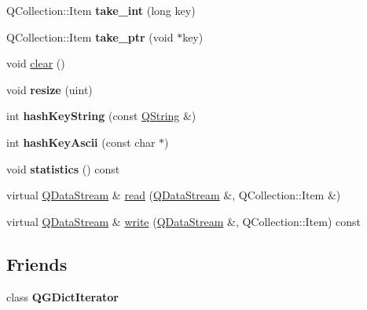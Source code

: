 \begin{DoxyCompactItemize}
\item 
\mbox{\label{class_q_g_dict_a1cd50eb19f0817df17350a978aa759d9}} 
Q\+Collection\+::\+Item {\bfseries take\+\_\+int} (long key)
\item 
\mbox{\label{class_q_g_dict_a96016e0d21a045d9901ba45182fdd80f}} 
Q\+Collection\+::\+Item {\bfseries take\+\_\+ptr} (void $\ast$key)
\item 
void \mbox{\hyperlink{class_q_g_dict_a991443b3568622b97772e234fe61dfd7}{clear}} ()
\item 
\mbox{\label{class_q_g_dict_a926ff48cc6b011ab9d40dd930c5eb8e7}} 
void {\bfseries resize} (uint)
\item 
\mbox{\label{class_q_g_dict_ad27652d613a6df366a5135ea8c4a8231}} 
int {\bfseries hash\+Key\+String} (const \mbox{\hyperlink{class_q_string}{Q\+String}} \&)
\item 
\mbox{\label{class_q_g_dict_ad3c9ab38e145042373e329e9ecbf8f25}} 
int {\bfseries hash\+Key\+Ascii} (const char $\ast$)
\item 
\mbox{\label{class_q_g_dict_a6293553459bc0566a6043cc0d4f8be7c}} 
void {\bfseries statistics} () const
\item 
virtual \mbox{\hyperlink{class_q_data_stream}{Q\+Data\+Stream}} \& \mbox{\hyperlink{class_q_g_dict_a236bd95bec134d7de77c0037b177ca8c}{read}} (\mbox{\hyperlink{class_q_data_stream}{Q\+Data\+Stream}} \&, Q\+Collection\+::\+Item \&)
\item 
virtual \mbox{\hyperlink{class_q_data_stream}{Q\+Data\+Stream}} \& \mbox{\hyperlink{class_q_g_dict_a0d6ba72de05ffbd4b935316cb901287e}{write}} (\mbox{\hyperlink{class_q_data_stream}{Q\+Data\+Stream}} \&, Q\+Collection\+::\+Item) const
\end{DoxyCompactItemize}
\subsection*{Friends}
\begin{DoxyCompactItemize}
\item 
\mbox{\label{class_q_g_dict_a2335fdd735e908a9e6f4f32d38da15f4}} 
class {\bfseries Q\+G\+Dict\+Iterator}
\end{DoxyCompactItemize}
